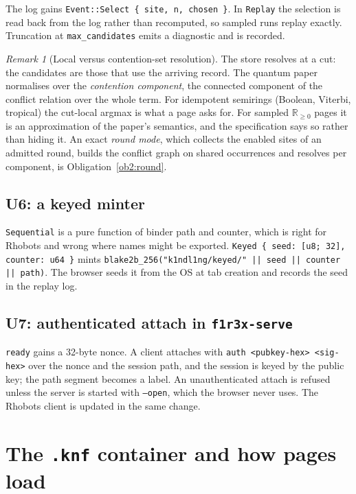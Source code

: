 \documentclass[11pt]{article}
\theoremstyle{definition}
\theoremstyle{remark}
\newtheorem{remark}{Remark}
\newcommand{\code}[1]{\texttt{#1}}
\begin{document}
\noindent
The log gains \code{Event::Select \{ site, n, chosen \}}. In \code{Replay} the
selection is read back from the log rather than recomputed, so sampled runs replay
exactly. Truncation at \code{max\_candidates} emits a diagnostic and is recorded.

\begin{remark}[Local versus contention-set resolution]\label{rem:local}
The store resolves at a cut: the candidates are those that use the arriving record.
The quantum paper normalises over the \emph{contention component}, the connected
component of the conflict relation over the whole term. For idempotent semirings
(Boolean, Viterbi, tropical) the cut-local argmax is what a page asks for. For
sampled $\mathbb{R}_{\geq 0}$ pages it is an approximation of the paper's
semantics, and the specification says so rather than hiding it. An exact
\emph{round mode}, which collects the enabled sites of an admitted round, builds the
conflict graph on shared occurrences and resolves per component, is
Obligation~\ref{ob2:round}.
\end{remark}

\subsection{U6: a keyed minter}
\code{Sequential} is a pure function of binder path and counter, which is right for
Rhobots and wrong where names might be exported. \code{Keyed \{ seed: [u8; 32],
counter: u64 \}} mints \code{blake2b\_256("k1ndl1ng/keyed/" || seed || counter ||
path)}. The browser seeds it from the OS at tab creation and records the seed in
the replay log.

\subsection{U7: authenticated attach in \code{f1r3x-serve}}\label{sec:u-serve}
\code{ready} gains a 32-byte nonce. A client attaches with
\code{auth <pubkey-hex> <sig-hex>} over the nonce and the session path, and the
session is keyed by the public key; the path segment becomes a label. An
unauthenticated attach is refused unless the server is started with
\code{--open}, which the browser never uses. The Rhobots client is updated in the
same change.

\section{The \code{.knf} container and how pages load}\label{sec:knf}
\end{document}
